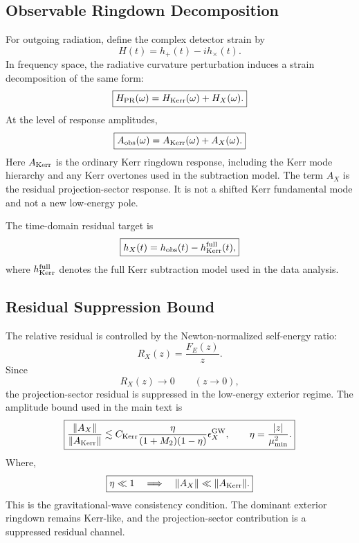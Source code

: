 \documentclass[11pt]{article}
\begin{document}
\subsection{Observable Ringdown Decomposition}

For outgoing radiation, define the complex detector strain by
\begin{equation}
\boxed{
H(t)
=
h_+(t)-ih_\times(t).
}
\end{equation}
In frequency space, the radiative curvature perturbation induces a strain decomposition of the same form:
\begin{equation}
\boxed{
H_{\rm PR}(\omega)
=
H_{\rm Kerr}(\omega)
+
H_X(\omega).
}
\end{equation}
At the level of response amplitudes,
\begin{equation}
\boxed{
A_{\rm obs}(\omega)
=
A_{\rm Kerr}(\omega)
+
A_X(\omega).
}
\end{equation}
Here \(A_{\rm Kerr}\) is the ordinary Kerr ringdown response, including the Kerr mode hierarchy and any Kerr overtones used in the subtraction model. The term \(A_X\) is the residual projection-sector response. It is not a shifted Kerr fundamental mode and not a new low-energy pole.

The time-domain residual target is
\begin{equation}
\boxed{
h_X(t)
=
h_{\rm obs}(t)
-
h_{\rm Kerr}^{\rm full}(t),
}
\end{equation}
where \(h_{\rm Kerr}^{\rm full}\) denotes the full Kerr subtraction model used in the data analysis.

\subsection{Residual Suppression Bound}

The relative residual is controlled by the Newton-normalized self-energy ratio:
\begin{equation}
\boxed{
R_X(z)
=
\frac{F_E(z)}{z}.
}
\end{equation}
Since
\begin{equation}
\boxed{
R_X(z)\rightarrow0
\qquad
(z\rightarrow0),
}
\end{equation}
the projection-sector residual is suppressed in the low-energy exterior regime. The amplitude bound used in the main text is
\begin{equation}
\boxed{
\frac{\|A_X\|}{\|A_{\rm Kerr}\|}
\lesssim
C_{\rm Kerr}
\frac{\eta}{(1+M_2)(1-\eta)}
\epsilon_X^{\rm GW},
\qquad
\eta
=
\frac{|z|}{\mu_{\min}^2}.
}
\end{equation}
Where,
\begin{equation}
\boxed{
\eta\ll1
\quad\Longrightarrow\quad
\|A_X\|\ll\|A_{\rm Kerr}\|.
}
\end{equation}
This is the gravitational-wave consistency condition. The dominant exterior ringdown remains Kerr-like, and the projection-sector contribution is a suppressed residual channel.
\end{document}
